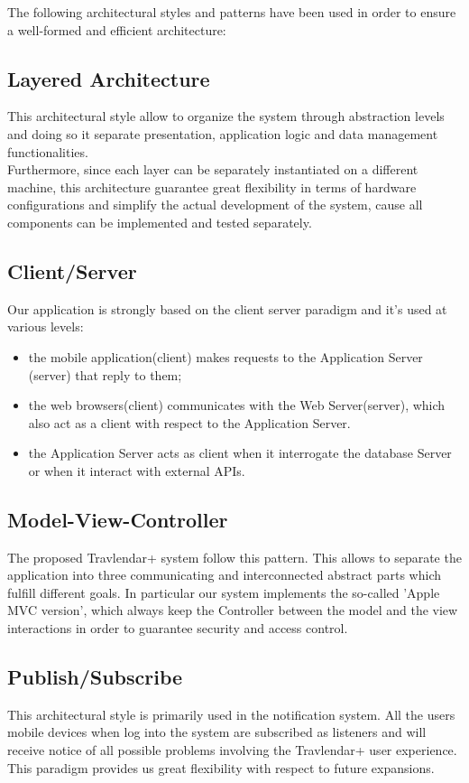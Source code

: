 The following architectural styles and patterns have been used in order to ensure a well-formed and efficient architecture:

\subsection{Layered Architecture}
\label{subsect:Layered Architecture}
This architectural style allow to organize the system through abstraction levels and doing so it separate presentation, application logic and data management functionalities.\\ Furthermore, since each layer can be separately instantiated on a
different machine, this architecture guarantee great flexibility in terms of hardware configurations and simplify the actual development of the system, cause all components can be implemented and tested separately.

\subsection{Client/Server}
\label{subsect:Client/Server}
Our application is strongly based on the client server paradigm and it's used at various levels:
\begin{itemize}
	\item the mobile application(client) makes requests to the Application Server (server) that reply to them;
	\item the web browsers(client) communicates with the Web Server(server), which also act as a client with respect to the Application Server.
	\item the Application Server acts as client when it interrogate the database Server or when it interact with external APIs.
\end{itemize}

\subsection{Model-View-Controller}
\label{subsect:Model-View-Controller}
The proposed Travlendar+ system follow this pattern. This allows to separate the application into three communicating and interconnected abstract parts which fulfill different goals. In particular our system implements the so-called 'Apple MVC version', which always keep the Controller between the model and the view interactions in order to guarantee security and  access control. 

\subsection{Publish/Subscribe}
\label{subsect:Publish/Subscribe}
This architectural style is primarily used in the notification system. All the users mobile devices when log into the system are subscribed as listeners and will receive notice of all possible problems involving the Travlendar+ user experience. This paradigm provides us great flexibility with respect to future expansions.

